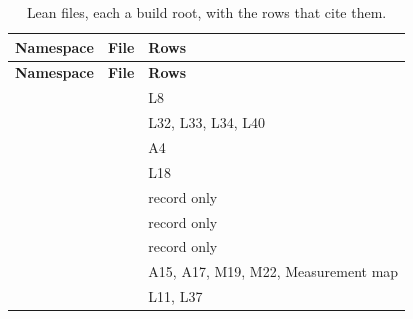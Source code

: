 \begin{longtable}{@{}P{3.4cm}P{8.2cm}P{4.6cm}@{}}
\caption{Lean files, each a build root, with the rows that cite them.}\label{tab:leanfiles}\\
\toprule
\textbf{Namespace} & \textbf{File} & \textbf{Rows} \\
\midrule
\endfirsthead
\toprule
\textbf{Namespace} & \textbf{File} & \textbf{Rows} \\
\midrule
\endhead
\bottomrule
\endfoot
{} & \href{https://github.com/anuragr81/research/blob/master/papers/subjective_racism/paper_a/lean/mathlib/AignerCain1977.lean}{} & L8 \\
 & \href{https://github.com/anuragr81/research/blob/master/papers/subjective_racism/paper_a/lean/mathlib/Akerlof1997.lean}{} & L32, L33, L34, L40 \\
 & \href{https://github.com/anuragr81/research/blob/master/papers/subjective_racism/paper_a/lean/mathlib/Assumptions.lean}{} & A4 \\
 & \href{https://github.com/anuragr81/research/blob/master/papers/subjective_racism/paper_a/lean/mathlib/AustenSmithFryer2003.lean}{} & L18 \\
 & \href{https://github.com/anuragr81/research/blob/master/papers/subjective_racism/paper_a/lean/mathlib/BertrandMullainathan2004.lean}{} & record only \\
 & \href{https://github.com/anuragr81/research/blob/master/papers/subjective_racism/paper_a/lean/mathlib/BohrenEtAl2019.lean}{} & record only \\
 & \href{https://github.com/anuragr81/research/blob/master/papers/subjective_racism/paper_a/lean/mathlib/BohrenEtAl2024.lean}{} & record only \\
 & \href{https://github.com/anuragr81/research/blob/master/papers/subjective_racism/paper_a/lean/mathlib/Budget.lean}{} & A15, A17, M19, M22, Measurement map \\
 & \href{https://github.com/anuragr81/research/blob/master/papers/subjective_racism/paper_a/lean/mathlib/CharlesEtAl2007.lean}{} & L11, L37 \\

\end{longtable}
